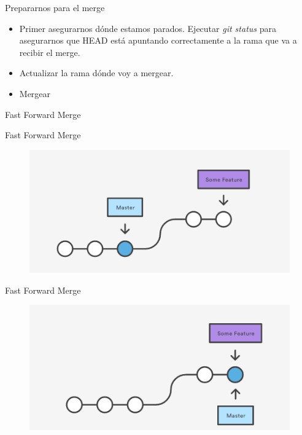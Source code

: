 \documentclass{beamer}
\begin{document}
\begin{frame}{Prepararnos para el merge}
\begin{itemize}
	\item Primer asegurarnos dónde estamos parados. Ejecutar \textit{git status} para asegurarnos que HEAD está apuntando
	correctamente a la rama que va a recibir el merge.
	\item Actualizar la rama dónde voy a mergear.
	\item Mergear
\end{itemize}
\end{frame}

\begin{frame}{}
	\center\Huge{Fast Forward Merge}
\end{frame}

\begin{frame}{Fast Forward Merge}
\begin{figure}
	\centering
	\includegraphics[width=1\linewidth]{1}
	\label{fig:1}
\end{figure}
\end{frame}

\begin{frame}{Fast Forward Merge}
	\begin{figure}
		\centering
		\includegraphics[width=1\linewidth]{2}
		\label{fig:2}
	\end{figure}
\end{frame}
\end{document}
